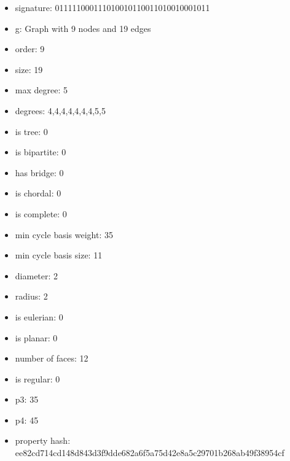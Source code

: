 \newpage
\begin{figure}
\end{figure}
\begin{itemize}
\item signature: 011111000111010010110011010010001011
\item g: Graph with 9 nodes and 19 edges
\item order: 9
\item size: 19
\item max degree: 5
\item degrees: 4,4,4,4,4,4,4,5,5
\item is tree: 0
\item is bipartite: 0
\item has bridge: 0
\item is chordal: 0
\item is complete: 0
\item min cycle basis weight: 35
\item min cycle basis size: 11
\item diameter: 2
\item radius: 2
\item is eulerian: 0
\item is planar: 0
\item number of faces: 12
\item is regular: 0
\item p3: 35
\item p4: 45
\item property hash: ee82cd714cd148d843d3f9dde682a6f5a75d42e8a5c29701b268ab49f38954cf
\end{itemize}
